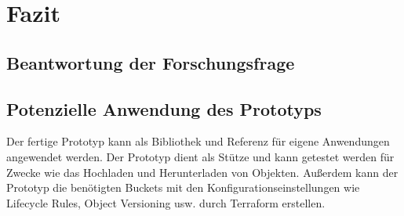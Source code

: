 \chapter{Fazit}

\section{Beantwortung der Forschungsfrage}



\section{Potenzielle Anwendung des Prototyps}

Der fertige Prototyp kann als Bibliothek und Referenz für eigene Anwendungen angewendet werden. 
Der Prototyp dient als Stütze und kann getestet werden für Zwecke wie das Hochladen und Herunterladen von Objekten. Außerdem kann der Prototyp die benötigten Buckets mit den Konfigurationseinstellungen wie Lifecycle Rules, Object Versioning usw. durch Terraform erstellen.